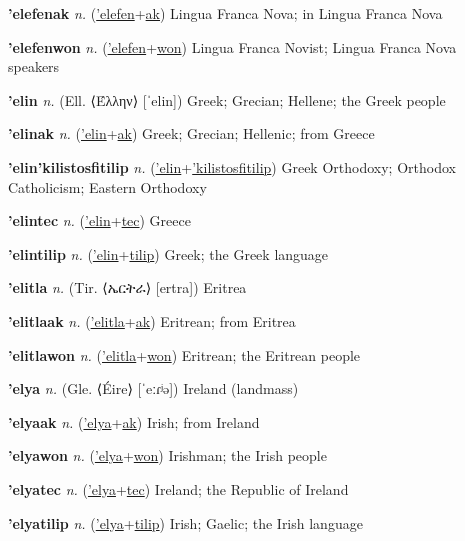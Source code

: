 \textbf{\hypertarget{'elefenak}{'elefenak}} \textit{n.} (\hyperlink{'elefen}{'elefen}+\allowbreak \hyperlink{ak}{ak})
Lingua Franca Nova; in Lingua Franca Nova

\textbf{\hypertarget{'elefenwon}{'elefenwon}} \textit{n.} (\hyperlink{'elefen}{'elefen}+\allowbreak \hyperlink{won}{won})
Lingua Franca Novist; Lingua Franca Nova speakers

\textbf{\hypertarget{'elin}{'elin}} \textit{n.} (Ell. ⟨Έλλην⟩ [ˈelin])
Greek; Grecian; Hellene; the Greek people

\textbf{\hypertarget{'elinak}{'elinak}} \textit{n.} (\hyperlink{'elin}{'elin}+\allowbreak \hyperlink{ak}{ak})
Greek; Grecian; Hellenic; from Greece

\textbf{\hypertarget{'elin'kilistosfitilip}{'elin'kilistosfitilip}} \textit{n.} (\hyperlink{'elin}{'elin}+\allowbreak \hyperlink{'kilistosfitilip}{'kilistosfitilip})
Greek Orthodoxy; Orthodox Catholicism; Eastern Orthodoxy

\textbf{\hypertarget{'elintec}{'elintec}} \textit{n.} (\hyperlink{'elin}{'elin}+\allowbreak \hyperlink{tec}{tec})
Greece

\textbf{\hypertarget{'elintilip}{'elintilip}} \textit{n.} (\hyperlink{'elin}{'elin}+\allowbreak \hyperlink{tilip}{tilip})
Greek; the Greek language

\textbf{\hypertarget{'elitla}{'elitla}} \textit{n.} (Tir. ⟨{\ethiopic{}ኤርትራ}⟩ [ertra])
Eritrea

\textbf{\hypertarget{'elitlaak}{'elitlaak}} \textit{n.} (\hyperlink{'elitla}{'elitla}+\allowbreak \hyperlink{ak}{ak})
Eritrean; from Eritrea

\textbf{\hypertarget{'elitlawon}{'elitlawon}} \textit{n.} (\hyperlink{'elitla}{'elitla}+\allowbreak \hyperlink{won}{won})
Eritrean; the Eritrean people

\textbf{\hypertarget{'elya}{'elya}} \textit{n.} (Gle. ⟨Éire⟩ [ˈeːɾʲə])
Ireland (landmass)

\textbf{\hypertarget{'elyaak}{'elyaak}} \textit{n.} (\hyperlink{'elya}{'elya}+\allowbreak \hyperlink{ak}{ak})
Irish; from Ireland

\textbf{\hypertarget{'elyawon}{'elyawon}} \textit{n.} (\hyperlink{'elya}{'elya}+\allowbreak \hyperlink{won}{won})
Irishman; the Irish people

\textbf{\hypertarget{'elyatec}{'elyatec}} \textit{n.} (\hyperlink{'elya}{'elya}+\allowbreak \hyperlink{tec}{tec})
Ireland; the Republic of Ireland

\textbf{\hypertarget{'elyatilip}{'elyatilip}} \textit{n.} (\hyperlink{'elya}{'elya}+\allowbreak \hyperlink{tilip}{tilip})
Irish; Gaelic; the Irish language

